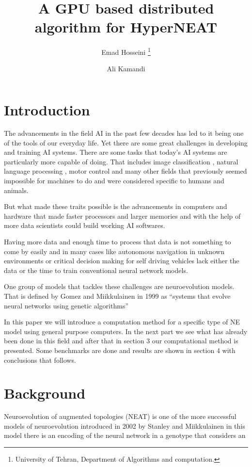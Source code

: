 \documentclass[twocolumn]{article}
\title{A GPU based distributed algorithm for HyperNEAT}
\author{Emad Hosseini \thanks{University of Tehran, 
Department of Algorithms and computation.} 
\and Ali Kamandi}
\begin{document}
\maketitle


\section{Introduction}
The advancements in the field AI in the past few decades
has led to it being one of the tools of our everyday
life. Yet there are some great challenges in developing
and training AI systems. There are some tasks that
today's AI systems are particularly more capable of
doing. That includes image classification 
\cite{DeepImageClassificationReview}, natural
language processing \cite{NLPReview}, motor control
\cite{DeepRlforMotorControl} and many other fields
that previously seemed impossible for machines to do
and were considered specific to humans and animals.

But what made these traits possible is the advancements
in computers and hardware that made faster processors and
larger memories and with the help of more data scientists
could build working AI softwares.

Having more data and enough time to process that data is
not something to come by easily and in many cases like 
autonomous navigation in unknown environments or critical 
decision making for self driving vehicles lack either 
the data or the time to train conventional neural network 
models.

One group of models that tackles these challenges are
neuroevolution models. That is defined by Gomez and 
Miikkulainen in 1999 as ``systems that evolve neural 
networks using genetic algorithms''
\cite{NEDefenitionMiikkulainen}

In this paper we will introduce a computation method
for a specific type of NE model using general purpose
computers. In the next part we see what has already
been done in this field and after that in section 3
our computational method is presented. Some benchmarks
are done and results are shown in section 4 with 
conclusions that follows.


\section{Background}
Neuroevolution of augmented topologies (NEAT) is one
of the more successful models of neuroevolution
introduced in 2002 by Stanley and Miikkulainen
\cite{originalNEAT} in this model there is an encoding
of the neural network in a genotype that considers
an 
\end{document}
